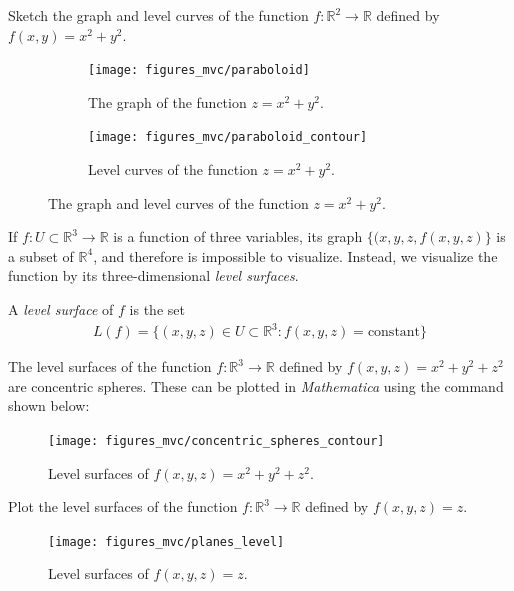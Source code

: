 \documentclass[12pt,letterpaper,reqno]{article}
\numberwithin{equation}{section}
\newcommand{\R}{\ensuremath{\mathbb R}}
\begin{document}
{\begin{exercise}
Sketch the graph and level curves of the function $f:\mathbb{R}^2 \to \mathbb{R}$ defined by $f(x,y)=x^2+y^2$. 	
\end{exercise}

{\color{red}
\begin{solution}
\end{solution}}
		\begin{figure}[h]
\centering
\begin{subfigure}{.5\textwidth}
  \centering
  \texttt{[image: figures\_mvc/paraboloid]}
  \caption{The graph of the function $z=x^2+y^2$.}
\end{subfigure}%
\begin{subfigure}{.5\textwidth}
  \centering
  \texttt{[image: figures\_mvc/paraboloid\_contour]}
  \caption{Level curves of the function $z=x^2+y^2$.}
\end{subfigure}
\caption{The graph and level curves of the function $z=x^2+y^2$.}
\end{figure}
\newpage 
If $f:U \subset \mathbb{R}^3 \to \mathbb{R}$ is a function of three variables, its graph $\{(x,y,z,f(x,y,z)\}$ is a subset of $\mathbb{R}^4$, and therefore is impossible to visualize. Instead, we visualize the function by its three-dimensional \emph{level surfaces}.

\begin{defn}
A \emph{level surface} of $f$ is the set
\begin{align*}
	L(f)=\{(x,y,z) \in U \subset \mathbb{R}^3:f(x,y,z)=\text{constant}\}
\end{align*}	
\end{defn}
\begin{example}
The level surfaces of the function $f:\R^3 \to \R$ defined by $f(x,y,z)=x^2+y^2+z^2$ are concentric spheres. These can be plotted in \emph{Mathematica} using the command shown below:
\begin{figure}[h]
	\begin{center}
		\texttt{[image: figures\_mvc/concentric\_spheres\_contour]}
	\end{center}
	\caption{Level surfaces of $f(x,y,z)=x^2+y^2+z^2$.}
\end{figure}
\end{example}
\newpage 
\begin{exercise}
Plot the level surfaces of the function $f:\R^3 \to \R$ defined by $f(x,y,z)=z$.	
\end{exercise}

{\color{red}
\begin{solution}
	\begin{figure}[h]
	\begin{center}
		\texttt{[image: figures\_mvc/planes\_level]}
	\end{center}
	\caption{Level surfaces of $f(x,y,z)=z$.}
\end{figure}
\end{solution}}

}
\end{document}
